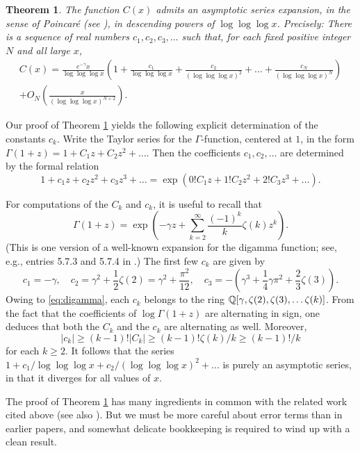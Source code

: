 \documentclass[11pt]{amsart}
\newtheorem{thm}{Theorem}[section]
\theoremstyle{remark}
\begin{document}
\begin{thm}\label{thm:main} The function $C(x)$ admits an asymptotic series expansion, in the sense of Poincar\'e {\rm(}see \cite[\S1.5]{dB81}{\rm)}, in descending powers of $\log\log\log{x}$. \emph{Precisely:} There is a sequence of real numbers $c_1, c_2, c_3, \dots$ such that, for each fixed positive integer $N$ and all large $x$,
\begin{multline*} C(x) = \frac{e^{-\gamma} x}{\log\log\log{x}} \left(1+\frac{c_1}{\log\log\log{x}} + \frac{c_2}{(\log\log\log{x})^2} + \dots + \frac{c_N}{(\log\log\log{x})^{N}}\right)\\ + O_{N}\left(\frac{x}{(\log\log\log{x})^{N+2}}\right). \end{multline*}
\end{thm}

Our proof of Theorem \ref{thm:main} yields the following explicit determination of the constants $c_k$. Write the Taylor series for the $\Gamma$-function, centered at $1$, in the form $\Gamma(1+z) = 1 + C_1 z + C_2 z^2 + \dots$.
Then the coefficients $c_1, c_2, \dots$ are determined by the formal relation
\[ 1 + c_1 z + c_2 z^2 + c_3 z^3 + \dots = \exp(0! C_1 z + 1! C_2 z^2 + 2! C_3 z^3 + \dots). \]

 For computations of the $C_k$ and $c_k$, it is useful to recall that \begin{equation}\label{eq:digamma} \Gamma(1+z) = \exp\left(-\gamma z + \sum_{k=2}^{\infty}\frac{(-1)^k}{k} \zeta(k) z^k\right). \end{equation}
(This is one version of a well-known expansion for the digamma function; see, e.g., entries 5.7.3 and 5.7.4 in \cite{NIST10}.) The first few $c_k$ are given by
\[ c_1 = -\gamma, \quad c_2 = \gamma^2 + \frac{1}{2}\zeta(2) = \gamma^2 + \frac{\pi^2}{12}, \quad c_3 = -\left(\gamma^3+\frac{1}{4}\gamma \pi^2 + \frac{2}{3}\zeta(3)\right). \]
Owing to \eqref{eq:digamma}, each $c_k$ belongs to the ring $\mathbb{Q}[\gamma,\zeta(2),\zeta(3),\dots\zeta(k)]$. From the fact that the coefficients of $\log \Gamma(1+z)$ are alternating in sign, one deduces that both the $C_k$ and the $c_k$ are alternating as well. Moreover, $$|c_k| \ge (k-1)!|C_k| \ge (k-1)! \zeta(k)/k \ge (k-1)!/k$$ for each $k\ge 2$. It follows that the  series $1+c_1/\log\log\log{x} + c_2/(\log\log\log{x})^2 + \dots$ is purely an asymptotic series, in that it diverges for all values of $x$.

The proof of Theorem \ref{thm:main} has many ingredients in common with the related work cited above (see also \cite{PP20, pollack20}). But we must be more careful about error terms than in earlier papers, and somewhat delicate bookkeeping is required to wind up with a clean result.
\end{document}

